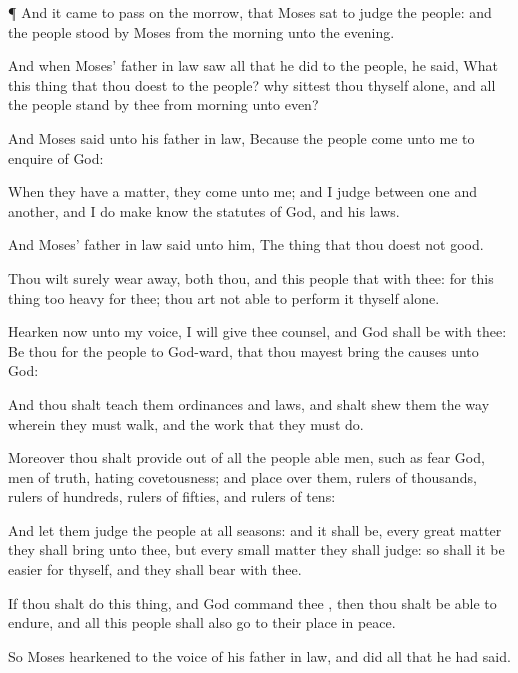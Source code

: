 {\par }{\PP {}¶ And it came to pass on the
morrow, that
Moses
sat to
judge the
people: and the
people
stood by
Moses from the
morning unto the
evening.

And when
Moses’ father in
law
saw all that he
did to the
people, he
said, What
{} this
thing that thou
doest to the
people? why
sittest thou thyself alone, and all the
people
stand by thee from
morning unto
even?

And
Moses
said unto his father in
law, Because the
people
come unto me to
enquire of
God:

When they have a
matter, they
come unto me; and I
judge between
one and
another, and I do make
{}
know the
statutes of
God, and his
laws.

And
Moses’ father in
law
said unto him, The
thing that thou
doest
{} not
good.

Thou wilt
surely wear
away, both thou, and this
people that
{} with thee: for this
thing
{} too
heavy for thee; thou art not
able to
perform it thyself alone.

Hearken now unto my
voice, I will give thee
counsel, and
God shall
be with thee: Be thou for the
people to
God-ward, that thou mayest
bring the
causes unto
God:

And thou shalt
teach them
ordinances and
laws, and shalt
shew them the
way wherein they must
walk, and the
work that they must
do.

Moreover thou shalt
provide out of all the
people
able
men, such as
fear
God,
men of
truth,
hating
covetousness; and
place
{} over them,
{}
rulers of
thousands,
{}
rulers of
hundreds,
rulers of
fifties, and
rulers of
tens:

And let them
judge the
people at all
seasons: and it shall be,
{} every
great
matter they shall
bring unto thee, but every
small
matter they shall
judge: so shall it be
easier for thyself, and they shall
bear
{} with thee.

If thou shalt
do this
thing, and
God
command thee
{}, then thou shalt be
able to
endure, and all this
people shall also
go to their
place in
peace.

So
Moses
hearkened to the
voice of his father in
law, and
did all that he had
said.

}
